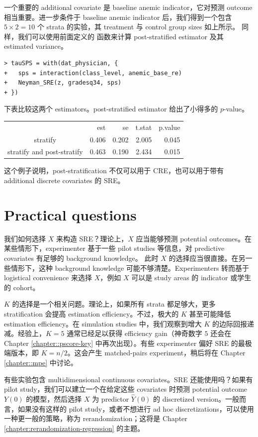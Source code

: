 一个重要的 additional covariate 是 baseline anemic indicator，它对预测 outcome 相当重要。进一步条件于 baseline anemic indicator 后，我们得到一个包含 $5\times 2 =10$ 个 strata 的实验，其 treatment 与 control group sizes 如上所示。
 同样，我们可以使用前面定义的  函数来计算 post-stratified estimator 及其 estimated variance。
 \begin{lstlisting}
> tauSPS = with(dat_physician, {
+   sps = interaction(class_level, anemic_base_re)
+   Neyman_SRE(z, gradesq34, sps)
+ })
\end{lstlisting}

下表比较这两个 estimators。post-stratified estimator 给出了小得多的 $p$-value。
\begin{center}
\begin{tabular}{crrrr}
                          & est &   se &t.stat& p.value \\
stratify                & 0.406 &0.202 & 2.005  & 0.045 \\
stratify and post-stratify & 0.463 &0.190 & 2.434 &  0.015
\end{tabular}
\end{center} 

这个例子说明，post-stratification 不仅可以用于 CRE，也可以用于带有 additional discrete covariates 的 SRE。


\section{Practical questions}


我们如何选择 $X$ 来构造 SRE？理论上，$X$ 应当能够预测 potential outcomes。在某些情形下，experimenter 基于一些 pilot studies 等信息，对 predictive covariates 有足够的 background knowledge。
此时 $X$ 的选择应当很直接。在另一些情形下，这种 background knowledge 可能不够清楚。Experimenters 转而基于 logistical convenience 来选择 $X$，例如 $X$ 可以是 study areas 的 indicator 或学生的 cohort。


$K$ 的选择是一个相关问题。理论上，如果所有 strata 都足够大，更多 stratification 会提高 estimation efficiency。不过，极大的 $K$ 甚至可能降低 estimation efficiency。在 simulation studies 中，我们观察到增大 $K$ 的边际回报递减。经验上，$K = 5$ 通常已经足以获得 efficiency gain（神奇数字 $5$ 还会在 Chapter \ref{chapter::pscore-key} 中再次出现）。有些 experimenter 偏好 SRE 的最极端版本，即 $K=n/2$。这会产生 matched-pairs experiment，稍后将在 Chapter \ref{chapter::mpe} 中讨论。


有些实验包含 multidimensional continuous covariates。SRE 还能使用吗？如果有 pilot study，我们可以建立一个在给定这些 covariates 时预测 potential outcome $Y(0)$ 的模型，然后选择 $X$ 为 predictor $\hat{Y}(0)$ 的 discretized version。一般而言，如果没有这样的 pilot study，或者不想进行 ad hoc discretizations，可以使用一种更一般的策略，称为 rerandomization；这将是 Chapter \ref{chapter:rerandomization-regression} 的主题。

